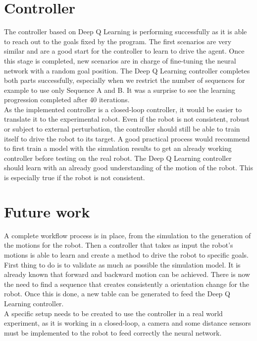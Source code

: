 \section{Controller}
    The controller based on Deep Q Learning is performing successfully as it is able to reach out to the goals fixed by the program. The first scenarios are very similar and are a good start for the controller to learn to drive the agent. Once this stage is completed, new scenarios are in charge of fine-tuning the neural network with a random goal position. The Deep Q Learning controller completes both parts successfully, especially when we restrict the number of sequences for example to use only Sequence A and B. It was a surprise to see the learning progression completed after 40 iterations. \\
    
    As the implemented controller is a closed-loop controller, it would be easier to translate it to the experimental robot. Even if the robot is not consistent, robust or subject to external perturbation, the controller should still be able to train itself to drive the robot to its target. A good practical process would recommend to first train a model with the simulation results to get an already working controller before testing on the real robot. The Deep Q Learning controller should learn with an already good understanding of the motion of the robot. This is especially true if the robot is not consistent.
    
\section{Future work}
    A complete workflow process is in place, from the simulation to the generation of the motions for the robot. Then a controller that takes as input the robot's motions is able to learn and create a method to drive the robot to specific goals. First thing to do is to validate as much as possible the simulation model. It is already known that forward and backward motion can be achieved. There is now the need to find a sequence that creates consistently a orientation change for the robot. Once this is done, a new table can be generated to feed the Deep Q Learning controller.\\
    
    A specific setup needs to be created to use the controller in a real world experiment, as it is working in a closed-loop, a camera and some distance sensors must be implemented to the robot to feed correctly the neural network.